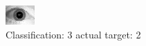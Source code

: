 \begin{figure}[h!]
\begin{center}
\includegraphics[width=0.60\columnwidth]{figures/ID1755_class_3_target_2.png}
\end{center}
\caption{ Classification: 3 actual target: 2}
\label{fig:ID1755_class_3_target_2}
\end{figure}
